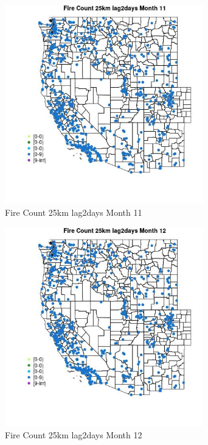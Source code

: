 \begin{figure} 
\centering  
\includegraphics[width=0.77\textwidth]{Code_Outputs/Report_ML_input_PM25_Step4_part_e_de_duplicated_aves_compiled_2019-05-21wNAs_MapObsMo11Fire_Count_25km_lag2days.jpg} 
\caption{\label{fig:Report_ML_input_PM25_Step4_part_e_de_duplicated_aves_compiled_2019-05-21wNAsMapObsMo11Fire_Count_25km_lag2days}Fire Count 25km lag2days Month 11} 
\end{figure} 
 

\clearpage 

\begin{figure} 
\centering  
\includegraphics[width=0.77\textwidth]{Code_Outputs/Report_ML_input_PM25_Step4_part_e_de_duplicated_aves_compiled_2019-05-21wNAs_MapObsMo12Fire_Count_25km_lag2days.jpg} 
\caption{\label{fig:Report_ML_input_PM25_Step4_part_e_de_duplicated_aves_compiled_2019-05-21wNAsMapObsMo12Fire_Count_25km_lag2days}Fire Count 25km lag2days Month 12} 
\end{figure} 
 


